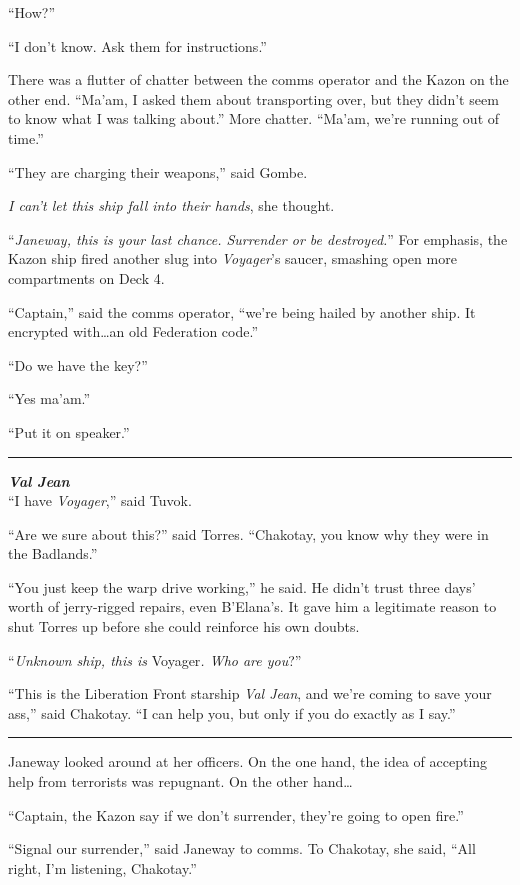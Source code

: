 \documentclass[twoside,letterpaper,12pt]{memoir}
\begin{document}
``How?''

``I don't know. Ask them for instructions.''

There was a flutter of chatter between the comms operator and the Kazon on the other end. ``Ma'am, I asked them about transporting over, but they didn't seem to know what I was talking about.'' More chatter. ``Ma'am, we're running out of time.''

``They are charging their weapons,'' said Gombe.

\textit{I can't let this ship fall into their hands}, she thought.

``\textit{Janeway, this is your last chance. Surrender or be destroyed.}'' For emphasis, the Kazon ship fired another slug into \textit{Voyager}'s saucer, smashing open more compartments on Deck 4.

``Captain,'' said the comms operator, ``we're being hailed by another ship. It encrypted with\ldots an old Federation code.''

``Do we have the key?''

``Yes ma'am.''

``Put it on speaker.''

\fancybreak{\rule{3cm}{0.4 pt}}
\noindent\textit{\textbf{Val Jean}}\\

``I have \textit{Voyager},'' said Tuvok.

``Are we sure about this?'' said Torres. ``Chakotay, you know why they were in the Badlands.''

``You just keep the warp drive working,'' he said. He didn't trust three days' worth of jerry-rigged repairs, even B'Elana's. It gave him a legitimate reason to shut Torres up before she could reinforce his own doubts.

``\textit{Unknown ship, this is }Voyager\textit{. Who are you}?''

``This is the Liberation Front starship \textit{Val Jean}, and we're coming to save your ass,'' said Chakotay. ``I can help you, but only if you do exactly as I say.''

\fancybreak{\rule{3cm}{0.4 pt}}
Janeway looked around at her officers. On the one hand, the idea of accepting help from terrorists was repugnant. On the other hand\ldots 

``Captain, the Kazon say if we don't surrender, they're going to open fire.''

``Signal our surrender,'' said Janeway to comms. To Chakotay, she said, ``All right, I'm listening, Chakotay.''
\end{document}
